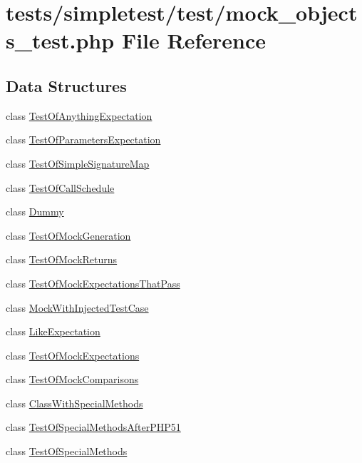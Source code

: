 \hypertarget{mock__objects__test_8php}{\section{tests/simpletest/test/mock\-\_\-objects\-\_\-test.php File Reference}
\label{mock__objects__test_8php}
}
\subsection*{Data Structures}
\begin{DoxyCompactItemize}
\item 
class \hyperlink{class_test_of_anything_expectation}{Test\-Of\-Anything\-Expectation}
\item 
class \hyperlink{class_test_of_parameters_expectation}{Test\-Of\-Parameters\-Expectation}
\item 
class \hyperlink{class_test_of_simple_signature_map}{Test\-Of\-Simple\-Signature\-Map}
\item 
class \hyperlink{class_test_of_call_schedule}{Test\-Of\-Call\-Schedule}
\item 
class \hyperlink{class_dummy}{Dummy}
\item 
class \hyperlink{class_test_of_mock_generation}{Test\-Of\-Mock\-Generation}
\item 
class \hyperlink{class_test_of_mock_returns}{Test\-Of\-Mock\-Returns}
\item 
class \hyperlink{class_test_of_mock_expectations_that_pass}{Test\-Of\-Mock\-Expectations\-That\-Pass}
\item 
class \hyperlink{class_mock_with_injected_test_case}{Mock\-With\-Injected\-Test\-Case}
\item 
class \hyperlink{class_like_expectation}{Like\-Expectation}
\item 
class \hyperlink{class_test_of_mock_expectations}{Test\-Of\-Mock\-Expectations}
\item 
class \hyperlink{class_test_of_mock_comparisons}{Test\-Of\-Mock\-Comparisons}
\item 
class \hyperlink{class_class_with_special_methods}{Class\-With\-Special\-Methods}
\item 
class \hyperlink{class_test_of_special_methods_after_p_h_p51}{Test\-Of\-Special\-Methods\-After\-P\-H\-P51}
\item 
class \hyperlink{class_test_of_special_methods}{Test\-Of\-Special\-Methods}
\item 

\end{DoxyCompactItemize}
